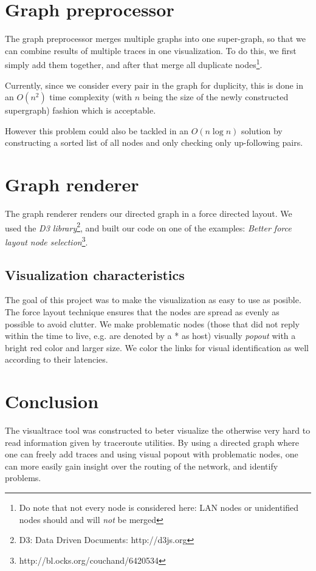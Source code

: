 \documentclass[a4paper,10pt]{article}
\begin{document}
\section{Graph preprocessor}
The graph preprocessor merges multiple graphs into one super-graph, so that we can combine results of multiple traces in one visualization. To do this, we first simply add them together, and after that merge all duplicate nodes\footnote{Do note that not every node is considered here: LAN nodes or unidentified nodes should and will \emph{not} be merged}.

Currently, since we consider every pair in the graph for duplicity, this is done in an $O(n^2)$ time complexity (with $n$ being the size of the newly constructed supergraph) fashion which is acceptable.

However this problem could also be tackled in an $O(n \log n)$ solution by constructing a sorted list of all nodes and only checking only up-following pairs.

\section{Graph renderer}
The graph renderer renders our directed graph in a force directed layout. We used the \emph{D3 library}\footnote{D3: Data Driven Documents: http://d3js.org}, and built our code on one of the examples: \emph{Better force layout node selection}\footnote{http://bl.ocks.org/couchand/6420534}. 

\subsection{Visualization characteristics}
The goal of this project was to make the visualization as easy to use as posible. The force layout technique ensures that the nodes are spread as evenly as possible to avoid clutter. We make problematic nodes (those that did not reply within the time to live, e.g. are denoted by a * as host) visually \emph{popout} with a bright red color and larger size. We color the links for visual identification as well according to their latencies.

\section{Conclusion}
The visualtrace tool was constructed to beter visualize the otherwise very hard to read information given by traceroute utilities. By using a directed graph where one can freely add traces and using visual popout with problematic nodes, one can more easily gain insight over the routing of the network, and identify problems.
\end{document}
